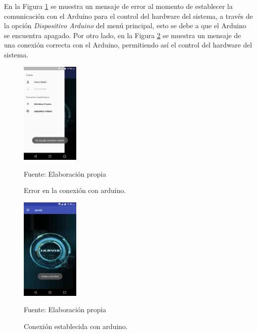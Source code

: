 En la Figura \ref{fig:figura3.60} se muestra un mensaje de error al momento de establecer la comunicación con el Arduino para el control del hardware del sistema, a través de la opción \textit{Dispositivo Arduino} del menú principal, esto se debe a que el Arduino se encuentra apagado. Por otro lado, en la Figura \ref{fig:figura3.61} se muestra un mensaje de una conexión correcta con el Arduino, permitiendo así el control del hardware del sistema.
\begin{figure}[H]
\captionsetup{justification=centering}
\begin{center}
\includegraphics[width=0.25\textwidth]{Imagenes/Cap3/image060}
\end{center}
\begin{center}
\vskip -0.5cm
\caption{\small{Error en la conexión con arduino.}}
\label{fig:figura3.60}
{\small{Fuente: Elaboración propia}}
\end{center}
\end{figure}

\begin{figure}[H]
\captionsetup{justification=centering}
\begin{center}
\includegraphics[width=0.25\textwidth]{Imagenes/Cap3/image061}
\end{center}
\begin{center}
\vskip -0.5cm
\caption{\small{Conexión establecida con arduino.}}
\label{fig:figura3.61}
{\small{Fuente: Elaboración propia}}
\end{center}
\end{figure}

